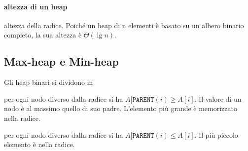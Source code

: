 \documentclass[11pt,a4paper]{article}
\begin{document}
\paragraph{altezza di un heap} altezza della radice. Poiché un heap di n elementi è basato su un albero binario completo, la sua altezza
è $\Theta(\lg n)$.

\subsection{Max-heap e Min-heap}
Gli heap binari si dividono in
\begin{description}[leftmargin=*]
  \item[max-heap] per ogni nodo diverso dalla radice si ha $A[\texttt{PARENT}(i) \geq A[i]$. Il valore di un nodo è al
massimo quello di suo padre. L’elemento più grande è memorizzato nella radice.
  \item[min-heap] per ogni nodo diverso dalla radice si ha $A[\texttt{PARENT}(i) \leq A[i]$. Il più piccolo elemento
è nella radice.
\end{description}
\end{document}
